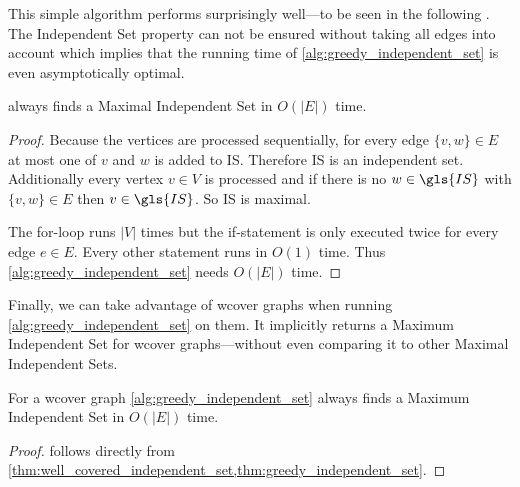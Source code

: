 This simple algorithm performs surprisingly well---to be seen in the
following . The Independent Set
property can not be ensured without taking all edges into account
which implies that the running time of
\cref{alg:greedy_independent_set} is even asymptotically optimal.

\begin{theorem}
  \label{thm:greedy_independent_set}
   always finds a
  Maximal Independent Set in \(O(|E|)\) time.
\end{theorem}

\begin{proof}
  Because the vertices are processed sequentially, for every edge
  \(\{v,w\} \in E\) at most one of \(v\) and \(w\) is added to
  \gls{IS}. Therefore \gls{IS} is an independent set. Additionally 
  every vertex \(v \in V\) is processed and if there is no
  \(w \in \gls{IS}\) with \(\{v,w\} \in E\) then \(v \in \gls{IS}\).
  So \gls{IS} is maximal.
  
  The for-loop runs \(|V|\) times but the if-statement is only
  executed twice for every edge \(e \in E\). Every other statement
  runs in \(O(1)\) time. Thus \cref{alg:greedy_independent_set} needs
  \(O(|E|)\) time.
\end{proof}

Finally, we can take advantage of \gls{wcover} graphs when running
\cref{alg:greedy_independent_set} on them. It implicitly returns a
Maximum Independent Set for \gls{wcover} graphs---without even
comparing it to other Maximal Independent Sets.

\begin{theorem}
  \label{thm:well_covered_maximum_independent_set}
  For a \gls{wcover} graph \cref{alg:greedy_independent_set} always
  finds a Maximum Independent Set in \(O(|E|)\) time.
\end{theorem}

\begin{proof}
   follows directly
  from \cref{thm:well_covered_independent_set,thm:greedy_independent_set}.
\end{proof}


